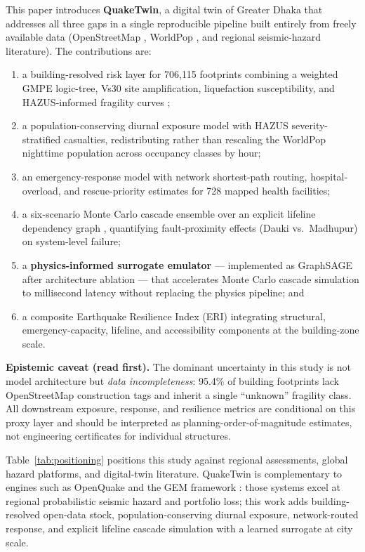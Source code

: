 \documentclass[a4paper,fleqn]{cas-sc}
\begin{document}
This paper introduces \textbf{QuakeTwin}, a digital twin of Greater Dhaka
that addresses all three gaps in a single reproducible pipeline built
entirely from freely available data (OpenStreetMap \cite{osm2008}, WorldPop
\cite{worldpop}, and regional seismic-hazard literature). The contributions
are:
\begin{enumerate}
  \item a building-resolved risk layer for 706{,}115 footprints combining a
        weighted GMPE logic-tree, Vs30 site amplification, liquefaction
        susceptibility, and HAZUS-informed fragility curves \cite{hazus};
  \item a population-conserving diurnal exposure model with HAZUS
        severity-stratified casualties, redistributing rather than rescaling
        the WorldPop nighttime population across occupancy classes by hour;
  \item an emergency-response model with network shortest-path routing,
        hospital-overload, and rescue-priority estimates for 728 mapped
        health facilities;
  \item a six-scenario Monte Carlo cascade ensemble over an explicit
        lifeline dependency graph \cite{motter2002,ouyang2014}, quantifying
        fault-proximity effects (Dauki vs.\ Madhupur) on system-level failure;
  \item a \textbf{physics-informed surrogate emulator} --- implemented as
        GraphSAGE \cite{hamilton2017} after architecture ablation --- that
        accelerates Monte Carlo cascade simulation to millisecond latency
        without replacing the physics pipeline; and
  \item a composite Earthquake Resilience Index (ERI) integrating structural,
        emergency-capacity, lifeline, and accessibility components at the
        building-zone scale.
\end{enumerate}

\textbf{Epistemic caveat (read first).} The dominant uncertainty in this
study is not model architecture but \textit{data incompleteness}: 95.4\% of
building footprints lack OpenStreetMap construction tags and inherit a
single ``unknown'' fragility class. All downstream exposure, response, and
resilience metrics are conditional on this proxy layer and should be
interpreted as planning-order-of-magnitude estimates, not engineering
certificates for individual structures.

Table~\ref{tab:positioning} positions this study against regional assessments,
global hazard platforms, and digital-twin literature. QuakeTwin is
complementary to engines such as OpenQuake \cite{pagani2014} and the GEM
framework \cite{gem2023}: those systems excel at regional probabilistic
seismic hazard and portfolio loss; this work adds building-resolved open-data
stock, population-conserving diurnal exposure, network-routed response, and
explicit lifeline cascade simulation with a learned surrogate at city scale.
\end{document}
